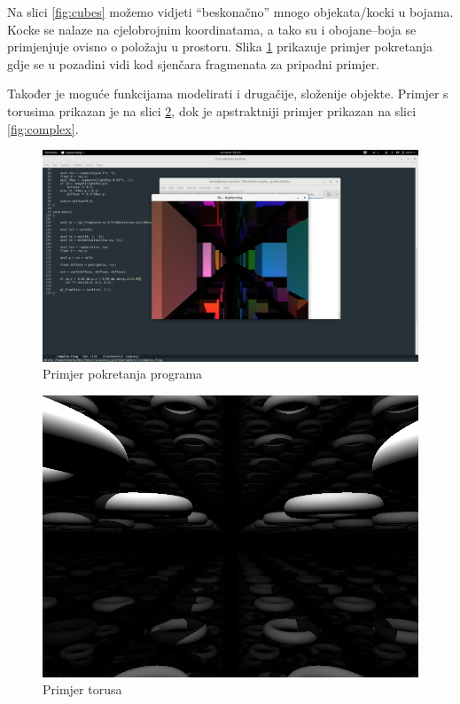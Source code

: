 \documentclass[a4paper,12pt]{article}
\begin{document}
Na slici \ref{fig:cubes} možemo vidjeti ``beskonačno'' mnogo objekata/kocki u bojama. Kocke se
nalaze na cjelobrojnim koordinatama, a tako su i obojane--boja se primjenjuje ovisno o položaju u
prostoru. Slika \ref{fig:run} prikazuje primjer pokretanja gdje se u pozadini vidi kod sjenčara
fragmenata za pripadni primjer.

Također je moguće funkcijama modelirati i drugačije, složenije objekte. Primjer s torusima prikazan
je na slici \ref{fig:tori}, dok je apstraktniji primjer prikazan na slici \ref{fig:complex}.

\begin{figure}[h]
  \centering
  \includegraphics[width=\textwidth]{screen3.png}
  \caption{Primjer pokretanja programa}
  \label{fig:run}
\end{figure}

\begin{figure}[h]
  \centering
  \includegraphics[width=\textwidth]{screen4.png}
  \caption{Primjer torusa}
  \label{fig:tori}
\end{figure}
\end{document}
